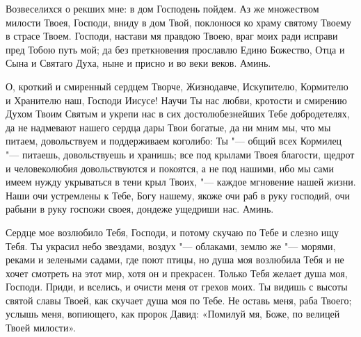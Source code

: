 Возвеселихся о рекших мне: в дом Господень пойдем. Аз же множеством милости Твоея, Господи, вниду в дом Твой, поклонюся ко храму святому Твоему в страсе Твоем. Господи, настави мя правдою Твоею, враг моих ради исправи пред Тобою путь мой; да без преткновения прославлю Едино Божество, Отца и Сына и Святаго Духа, ныне и присно и во веки веков. Аминь. 
\nopagebreak\bigskip\bigskip\mychapterending

 


О, кроткий и смиренный сердцем Творче, Жизнодавче, Искупителю, Кормителю и Хранителю наш, Господи Иисусе! Научи Ты нас любви, кротости и смирению Духом Твоим Святым и укрепи нас в сих достолюбезнейших Тебе добродетелях, да не надмевают нашего сердца дары Твои богатые, да ни мним мы, что мы питаем, довольствуем и поддерживаем коголибо: Ты "--- общий всех Кормилец "--- питаешь, довольствуешь и хранишь; все под крылами Твоея благости, щедрот и человеколюбия довольствуются и покоятся, а не под нашими, ибо мы сами имеем нужду укрываться в тени крыл Твоих, "--- каждое мгновение нашей жизни. Наши очи устремлены к Тебе, Богу нашему, якоже очи раб в руку господий, очи рабыни в руку госпожи своея, дондеже ущедриши нас. Аминь.
\nopagebreak\bigskip\bigskip\mychapterending

 


Сердце мое возлюбило Тебя, Господи, и потому скучаю по Тебе и слезно ищу Тебя. Ты украсил небо звездами, воздух "--- облаками, землю же "--- морями, реками и зелеными садами, где поют птицы, но душа моя возлюбила Тебя и не хочет смотреть на этот мир, хотя он и прекрасен. Только Тебя желает душа моя, Господи. Приди, и вселись, и очисти меня от грехов моих. Ты видишь с высоты святой славы Твоей, как скучает душа моя по Тебе. Не оставь меня, раба Твоего; услышь меня, вопиющего, как пророк Давид: «Помилуй мя, Боже, по велицей Твоей милости».
\nopagebreak\bigskip\bigskip\mychapterending

 


